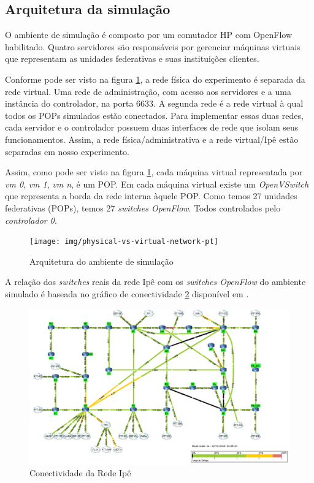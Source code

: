 
\subsection{Arquitetura da simulação}

O ambiente de simulação é composto por um comutador HP com OpenFlow habilitado.
Quatro servidores são responsáveis por gerenciar máquinas virtuais que
representam as unidades federativas e suas instituições clientes.

Conforme pode ser visto na figura \ref{fig:physical-vs-virtual-network}, a
rede física do experimento é separada da rede virtual.
Uma rede de administração, com acesso aos servidores e a uma instância do
controlador, na porta 6633.
A segunda rede é a rede virtual à qual todos os POPs simulados estão
conectados.
Para implementar essas duas redes, cada servidor e o controlador possuem duas
interfaces de rede que isolam seus funcionamentos.
Assim, a rede física/administrativa e a rede virtual/Ipê estão separadas
em nosso experimento.

Assim, como pode ser visto na figura \ref{fig:physical-vs-virtual-network},
cada máquina virtual representada por \emph{vm 0}, \emph{vm 1}, \emph{vm n},
é um POP.
Em cada máquina virtual existe um \emph{OpenVSwitch} que representa a borda
da rede interna àquele POP.
Como temos 27 unidades federativas (POPs), temos 27 \emph{switches OpenFlow}.
Todos controlados pelo \emph{controlador 0}.

\begin{figure}[!h]
    \centering
    \label{fig:physical-vs-virtual-network}
    \texttt{[image: img/physical-vs-virtual-network-pt]}
    \caption{Arquitetura do ambiente de simulação}
\end{figure}

A relação dos \emph{switches} reais da rede Ipê com os \emph{switches OpenFlow}
do ambiente simulado é baseada no gráfico de conectividade
\ref{fig:rnp-ipe-connectivity} disponível em \citep{rede2015conectividade}.

\begin{figure}[!h]
    \centering
    \label{fig:rnp-ipe-connectivity}
    \includegraphics[width=\textwidth]{img/rnp-ipe-connectivity}
    \caption{Conectividade da Rede Ipê}
\end{figure}



